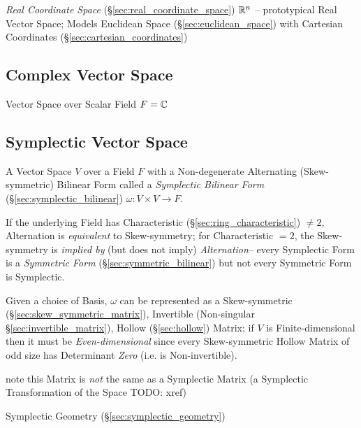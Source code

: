 \fist \emph{Real Coordinate Space} (\S\ref{sec:real_coordinate_space})
$\mathbb{R}^n$ -- prototypical Real Vector Space; Models Euclidean Space
(\S\ref{sec:euclidean_space}) with Cartesian Coordinates
(\S\ref{sec:cartesian_coordinates})



\subsection{Complex Vector Space}\label{sec:complex_vector_space}

Vector Space over Scalar Field $F = \mathbb{C}$



\subsection{Symplectic Vector Space}\label{sec:symplectic_vectorspace}

A Vector Space $V$ over a Field $F$ with a Non-degenerate Alternating
(Skew-symmetric) Bilinear Form called a \emph{Symplectic Bilinear Form}
(\S\ref{sec:symplectic_bilinear}) $\omega : V \times V \rightarrow F$.

If the underlying Field has Characteristic (\S\ref{sec:ring_characteristic})
$\neq 2$, Alternation is \emph{equivalent} to Skew-symmetry; for Characteristic
$=2$, the Skew-symmetry is \emph{implied by} (but does not imply)
\emph{Alternation}-- every Symplectic Form is a \emph{Symmetric Form}
(\S\ref{sec:symmetric_bilinear}) but not every Symmetric Form is Symplectic.

Given a choice of Basis, $\omega$ can be represented as a Skew-symmetric
(\S\ref{sec:skew_symmetric_matrix}), Invertible (Non-singular
\S\ref{sec:invertible_matrix}), Hollow (\S\ref{sec:hollow}) Matrix; if $V$ is
Finite-dimensional then it must be \emph{Even-dimensional} since every
Skew-symmetric Hollow Matrix of odd size has Determinant \emph{Zero} (i.e.
is Non-invertible).

note this Matrix is \emph{not} the same as a Symplectic Matrix (a Symplectic
Transformation of the Space TODO: xref)

\fist Symplectic Geometry (\S\ref{sec:symplectic_geometry})

